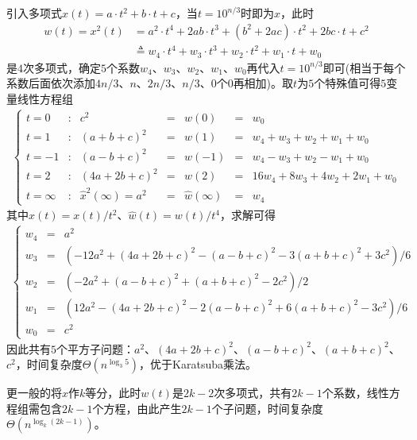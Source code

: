 \documentclass{ctexart}
\begin{document}
引入多项式$x(t) = a \cdot t^2 + b \cdot t + c$，当$t = 10^{n/3}$时即为$x$，此时
\begin{align*}
    w(t) = x^2(t) & = a^2 \cdot t^4 + 2 ab \cdot t^3 + (b^2 + 2ac) \cdot t^2 + 2bc \cdot t + c^2 \\
                  & \triangleq w_4 \cdot t^4 + w_3 \cdot t^3 + w_2 \cdot t^2 + w_1 \cdot t + w_0
\end{align*}
是$4$次多项式，确定$5$个系数$w_4$、$w_3$、$w_2$、$w_1$、$w_0$再代入$t = 10^{n/3}$即可(相当于每个系数后面依次添加$4n/3$、$n$、$2n/3$、$n/3$、$0$个$0$再相加)。取$t$为$5$个特殊值可得$5$变量线性方程组
\begin{align*}
    \left\{ \begin{array}{lcrcccl}
                t = 0      & : & c^2                          & = & w(0)                & = & w_0                                  \\
                t = 1      & : & (a+b+c)^2                    & = & w(1)                & = & w_4 + w_3 + w_2 + w_1 + w_0          \\
                t = -1     & : & (a-b+c)^2                    & = & w(-1)               & = & w_4 - w_3 + w_2 - w_1 + w_0          \\
                t = 2      & : & (4a+2b+c)^2                  & = & w(2)                & = & 16 w_4 + 8 w_3 + 4 w_2 + 2 w_1 + w_0 \\
                t = \infty & : & \widehat{x}^2 (\infty) = a^2 & = & \widehat{w}(\infty) & = & w_4
            \end{array} \right.
\end{align*}
其中$\widehat{x}(t) = x(t) / t^2$、$\widehat{w}(t) = w(t) / t^4$，求解可得
\begin{align*}
    \left\{ \begin{array}{rcl}
                w_4 & = & a^2                                                            \\
                w_3 & = & (-12 a^2 + (4a+2b+c)^2 - (a-b+c)^2 - 3 (a+b+c)^2 + 3 c^2) / 6  \\
                w_2 & = & (-2 a^2 + (a-b+c)^2 + (a+b+c)^2 - 2 c^2) / 2                   \\
                w_1 & = & (12 a^2 - (4a+2b+c)^2 - 2 (a-b+c)^2 + 6 (a+b+c)^2 - 3 c^2) / 6 \\
                w_0 & = & c^2
            \end{array} \right.
\end{align*}
因此共有$5$个平方子问题：$a^2$、$(4a+2b+c)^2$、$(a-b+c)^2$、$(a+b+c)^2$、$c^2$，时间复杂度$\Theta(n^{\log_3 5})$，优于Karatsuba乘法。

更一般的将$x$作$k$等分，此时$w(t)$是$2k-2$次多项式，共有$2k-1$个系数，线性方程组需包含$2k-1$个方程，由此产生$2k-1$个子问题，时间复杂度$\Theta(n^{\log_k (2k-1)})$。
\end{document}
